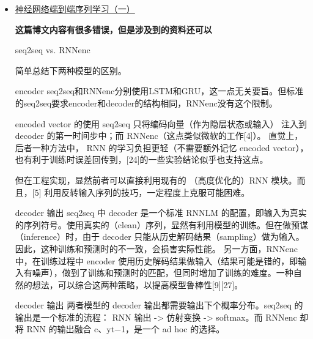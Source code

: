 \documentclass[10pt,a4paper]{ctexbook}
\begin{document}
\begin{itemize}
\item \href{http://blog.csdn.net/jackytintin/article/details/53352063}{神经网络端到端序列学习（一）}

\textbf{这篇博文内容有很多错误，但是涉及到的资料还可以}

seq2seq vs. RNNenc

简单总结下两种模型的区别。

\subitem encoder 
    \subsubitem seq2seq和RNNenc分别使用LSTM和GRU，这一点无关要旨。但标准的seq2seq要求encoder和decoder的结构相同，RNNenc没有这个限制。

\subitem encoded vector 的使用 
    \subsubitem seq2seq 只将编码向量（作为隐层状态或输入） 注入到 decoder 的第一时间步中；而 RNNenc（这点类似微软的工作[4]）。 
                直觉上，后者一种方法中， RNN 的学习负担更轻（不需要额外记忆 encoded vector），也有利于训练时误差回传到，[24]的一些实验结论似乎也支持这点。

    \subsubitem 但在工程实现，显然前者可以直接利用现有的 （高度优化的）RNN 模块。而且，[5] 利用反转输入序列的技巧，一定程度上克服可能困难。

\subitem decoder 输出 
\subsubitem seq2seq 中 decoder 是一个标准 RNNLM 的配置，即输入为真实的序列符号。使用真实的（clean）序列，显然有利用模型的训练。但在做预谋（inference）时，由于 decoder 只能从历史解码结果（sampling）做为输入。因此，这种训练和预测时的不一致，会损害实际性能。 
\subsubitem 另一方面，RNNenc 中，在训练过程中 encoder 使用历史解码结果做输入（结果可能是错的，即输入有噪声），做到了训练和预测时的匹配，但同时增加了训练的难度。一种自然的想法，可以综合这两种策略，以提高模型鲁棒性[9][27]。

decoder 输出 
两者模型的 decoder 输出都需要输出下个概率分布。seq2seq 的输出是一个标准的流程： RNN 输出 -> 仿射变换 -> softmax。而 RNNenc 却将 RNN 的输出融合 c、yt−1，是一个 ad hoc 的选择。


\end{itemize}
\end{document}
